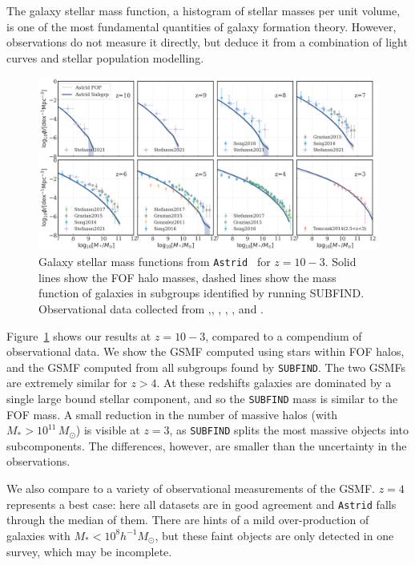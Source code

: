 \documentclass[fleqn,usenatbib]{mnras}
\def\astrid{\texttt{Astrid} }
\def\msun{\, M_{\odot}}
\begin{document}
The galaxy stellar mass function, a histogram of stellar masses per unit volume, is one of the most fundamental quantities of galaxy formation theory. However, observations do not measure it directly, but deduce it from a combination of light curves and stellar population modelling.

\begin{figure}
\centering
  \includegraphics[width=1.0\textwidth]{plots/GSMF-subfind-z10-z3.png}
  \caption{Galaxy stellar mass functions from \astrid~for $z=10-3$. Solid lines show the FOF halo masses, dashed lines show the mass function of galaxies in subgroups identified by running SUBFIND. Observational data collected from \citet{Gonzalez2011},\citet{Tomczak2014}, \citet{Grazian2015}, \citet{Song2016}, \citet{Stefanon2017}, and \citet{Stefanon2021}.}
  \label{fig:GSMF}
\end{figure}

Figure~\ref{fig:GSMF} shows our results at $z = 10 - 3$, compared to a compendium of observational data. We show the GSMF computed using stars within FOF halos, and the GSMF computed from all subgroups found by \texttt{SUBFIND}. The two GSMFs are extremely similar for $z > 4$. At these redshifts galaxies are dominated by a single large bound stellar component, and so the \texttt{SUBFIND} mass is similar to the FOF mass. A small reduction in the number of massive halos (with $M_* > 10^{11} \msun$) is visible at $z=3$, as \texttt{SUBFIND} splits the most massive objects into subcomponents. The differences, however, are smaller than the uncertainty in the observations.

We also compare to a variety of observational measurements of the GSMF. $z=4$ represents a best case: here all datasets are in good agreement and \astrid falls through the median of them. There are hints of a mild over-production of galaxies with $M_* < 10^8 h^{-1} M_\odot$, but these faint objects are only detected in one survey, which may be incomplete.
\end{document}
